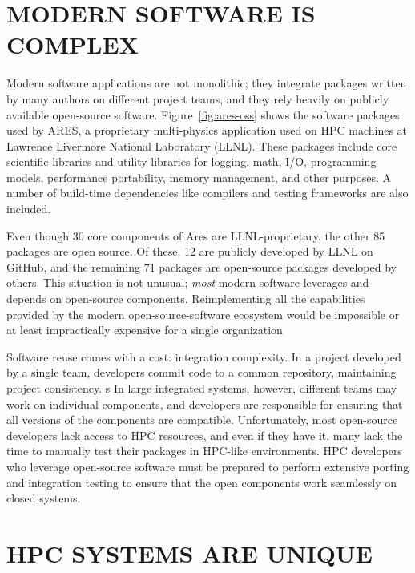 \documentclass{IEEEcsmag}
\begin{document}
\section{MODERN SOFTWARE IS COMPLEX}

Modern software applications are not monolithic; they integrate packages written by many
authors on different project teams, and they rely heavily on publicly available open-source software. Figure~\ref{fig:ares-oss} shows the software packages used by ARES, a
proprietary multi-physics application used on HPC machines at Lawrence Livermore
National Laboratory (LLNL). These packages include core scientific libraries and
utility libraries for logging, math, I/O, programming models, performance portability,
memory management, and other purposes. A number of build-time
dependencies like compilers and testing frameworks are also included.

Even though 30 core components of Ares are LLNL-proprietary, the other 85 packages are
open source. Of these, 12 are publicly developed by LLNL on GitHub, and the remaining 71
packages are open-source packages developed by others. This situation is not unusual;
{\it most} modern software leverages and depends on open-source components.
Reimplementing all the capabilities provided by the modern open-source-software ecosystem would be impossible or at least impractically expensive for a single organization

Software reuse comes with a cost: integration complexity.
In a project developed by a single team, developers commit code to a common repository, maintaining project consistency. s
In large integrated systems, however, different teams may work on individual components, and developers are responsible for ensuring that all versions of the components are compatible.
Unfortunately, most open-source developers lack access to HPC resources, and even if they have it, many lack the time to manually test their packages in HPC-like environments. HPC developers who leverage open-source software must be prepared to perform extensive porting and integration testing to ensure that the open components work seamlessly on closed systems.


\section{HPC SYSTEMS ARE UNIQUE}
\end{document}
